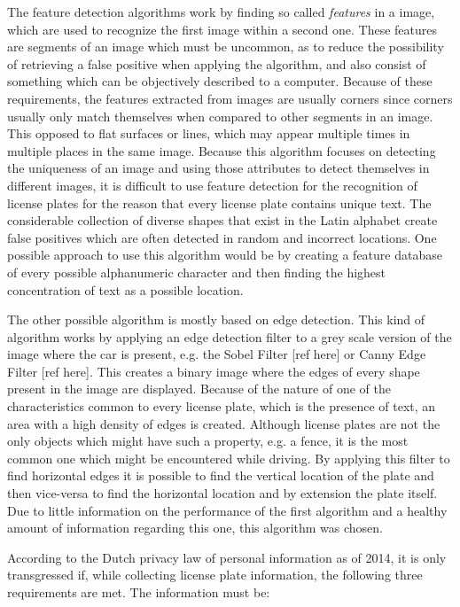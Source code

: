 The feature detection algorithms work by finding so called \emph{features} in a image, which are used to recognize the first image within a second one. These features are segments of an image which must be uncommon, as to reduce the possibility of retrieving a false positive when applying the algorithm, and also consist of something which can be objectively described to a computer. Because of these requirements, the features extracted from images are usually corners since corners usually only match themselves when compared to other segments in an image. This opposed to flat surfaces or lines, which may appear multiple times in multiple places in the same image. Because this algorithm focuses on detecting the uniqueness of an image and using those attributes to detect themselves in different images, it is difficult to use feature detection for the recognition of license plates for the reason that every license plate contains unique text. The considerable collection of diverse shapes that exist in the Latin alphabet create false positives which are often detected in random and incorrect locations. One possible approach to use this algorithm would be by creating a feature database of every possible alphanumeric character and then finding the highest concentration of text as a possible location. 

The other possible algorithm is mostly based on edge detection. This kind of algorithm works by applying an edge detection filter to a grey scale version of the image where the car is present, e.g. the Sobel Filter [ref here] or Canny Edge Filter [ref here]. This creates a binary image where the edges of every shape present in the image are displayed. Because of the nature of one of the characteristics common to every license plate, which is the presence of text, an area with a high density of edges is created. Although license plates are not the only objects which might have such a property, e.g. a fence, it is the most common one which might be encountered while driving. By applying this filter to find horizontal edges it is possible to find the vertical location of the plate and then vice-versa to find the horizontal location and by extension the plate itself. Due to little information on the performance of the first algorithm and a healthy amount of information regarding this one, this algorithm was chosen.


According to the Dutch privacy law of personal information as of 2014, it is only transgressed if, while collecting license plate information, the following three requirements are met. The information must be:

